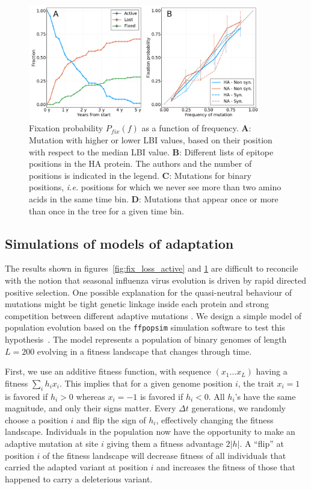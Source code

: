 \documentclass[reprint,amsmath,amssymb,superscriptaddress,showpacs,pre]{revtex4-1}
\begin{document}
\begin{figure}
	\centering
	\includegraphics[width=0.9\textwidth]{./Figures/Panel3.png}
	\caption{Fixation probability $P_{fix}(f)$ as a function of frequency. \textbf{A}: Mutation with higher or lower LBI values, based on their position with respect to the median LBI value. \textbf{B}: Different lists of epitope positions in the HA protein. The authors and the number of positions is indicated in the legend. \textbf{C}: Mutations for binary positions, \emph{i.e.} positions for which we never see more than two amino acids in the same time bin. \textbf{D}: Mutations that appear once or more than once in the tree for a given time bin.}
	\label{fig:pfix_stratified}
\end{figure}

\subsection*{Simulations of models of adaptation}
\label{sub:a_simple_model}

The results shown in figures~\ref{fig:fix_loss_active} and \ref{fig:pfix_stratified} are difficult to reconcile with the notion that seasonal influenza virus evolution is driven by rapid directed positive selection.
One possible explanation for the quasi-neutral behaviour of mutations might be tight genetic linkage inside each protein and strong competition between different adaptive mutations \citep{neher_genetic_2011}. 
We design a simple model of population evolution based on the \texttt{ffpopsim} simulation software to test this hypothesis~\cite{10.1093/bioinformatics/bts633}. 
The model represents a population of binary genomes of length $L=200$ evolving in a fitness landscape that changes through time. 

First, we use an additive fitness function, with sequence $(x_1\ldots x_L)$ having a fitness $\sum_i h_i x_i$. 
This implies that for a given genome position $i$, the trait $x_i = 1$ is favored if $h_i>0$ whereas  $x_i = -1$ is favored if $h_i<0$. 
All $h_i$'s have the same magnitude, and only their signs matter. 
Every $\Delta t$ generations, we randomly choose a position $i$ and flip the sign of $h_i$, effectively changing the fitness landscape. 
Individuals in the population now have the opportunity to make an adaptive mutation at site $i$ giving them a fitness advantage $2\vert h \vert$. 
A ``flip'' at position $i$ of the fitness landscape will decrease fitness of all individuals that carried the adapted variant at position $i$ and increases the fitness of those that happened to carry a deleterious variant. 
\end{document}
